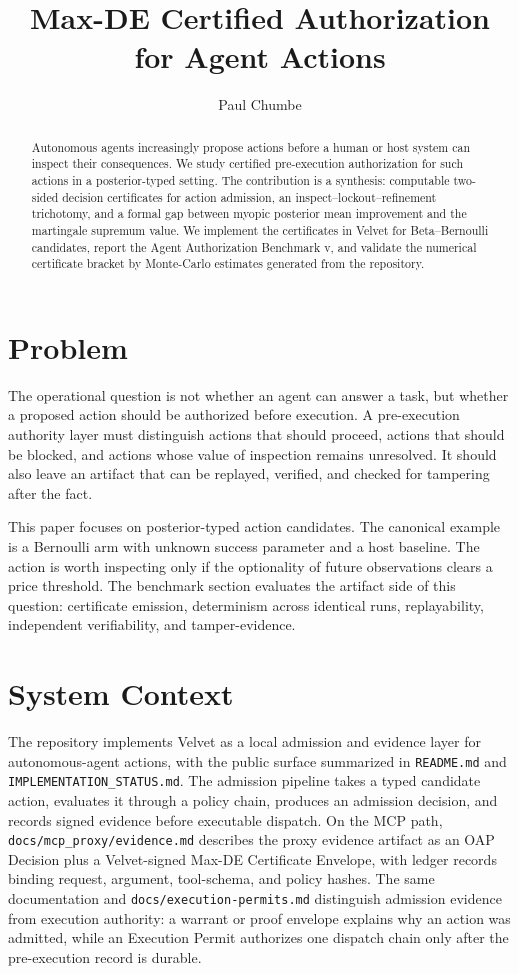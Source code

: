 \documentclass[11pt]{article}
\title{Max-DE Certified Authorization for Agent Actions}
\author{Paul Chumbe}
\date{}
\begin{document}
\maketitle

\begin{abstract}
Autonomous agents increasingly propose actions before a human or host system can inspect their consequences. We study certified pre-execution authorization for such actions in a posterior-typed setting. The contribution is a synthesis: computable two-sided decision certificates for action admission, an inspect--lockout--refinement trichotomy, and a formal gap between myopic posterior mean improvement and the martingale supremum value. We implement the certificates in Velvet for Beta--Bernoulli candidates, report the Agent Authorization Benchmark v\BenchmarkVersion{}, and validate the numerical certificate bracket by Monte-Carlo estimates generated from the repository.
\end{abstract}

\section{Problem}

The operational question is not whether an agent can answer a task, but whether a proposed action should be authorized before execution. A pre-execution authority layer must distinguish actions that should proceed, actions that should be blocked, and actions whose value of inspection remains unresolved. It should also leave an artifact that can be replayed, verified, and checked for tampering after the fact.

This paper focuses on posterior-typed action candidates. The canonical example is a Bernoulli arm with unknown success parameter and a host baseline. The action is worth inspecting only if the optionality of future observations clears a price threshold. The benchmark section evaluates the artifact side of this question: certificate emission, determinism across \BenchmarkRepeatCount{} identical runs, replayability, independent verifiability, and tamper-evidence.

\section{System Context}

The repository implements Velvet as a local admission and evidence layer for autonomous-agent actions, with the public surface summarized in \texttt{README.md} and \texttt{IMPLEMENTATION\_STATUS.md}. The admission pipeline takes a typed candidate action, evaluates it through a policy chain, produces an admission decision, and records signed evidence before executable dispatch. On the MCP path, \texttt{docs/mcp\_proxy/evidence.md} describes the proxy evidence artifact as an OAP Decision plus a Velvet-signed Max-DE Certificate Envelope, with ledger records binding request, argument, tool-schema, and policy hashes. The same documentation and \texttt{docs/execution-permits.md} distinguish admission evidence from execution authority: a warrant or proof envelope explains why an action was admitted, while an Execution Permit authorizes one dispatch chain only after the pre-execution record is durable.
\end{document}
